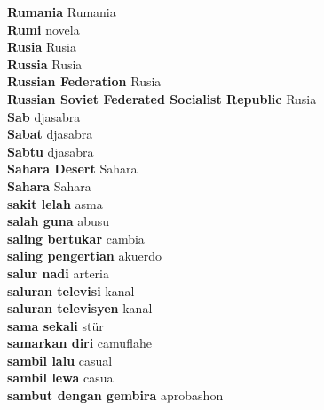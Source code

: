 \textbf{ Rumania  } Rumania \\
\textbf{ Rumi  } novela \\
\textbf{ Rusia  } Rusia \\
\textbf{ Russia  } Rusia \\
\textbf{ Russian Federation  } Rusia \\
\textbf{ Russian Soviet Federated Socialist Republic  } Rusia \\
\textbf{ Sab  } djasabra \\
\textbf{ Sabat  } djasabra \\
\textbf{ Sabtu  } djasabra \\
\textbf{ Sahara Desert  } Sahara \\
\textbf{ Sahara  } Sahara \\
\textbf{ sakit lelah  } asma \\
\textbf{ salah guna  } abusu \\
\textbf{ saling bertukar  } cambia \\
\textbf{ saling pengertian  } akuerdo \\
\textbf{ salur nadi  } arteria \\
\textbf{ saluran televisi  } kanal \\
\textbf{ saluran televisyen  } kanal \\
\textbf{ sama sekali  } stür \\
\textbf{ samarkan diri  } camuflahe \\
\textbf{ sambil lalu  } casual \\
\textbf{ sambil lewa  } casual \\
\textbf{ sambut dengan gembira  } aprobashon \\
